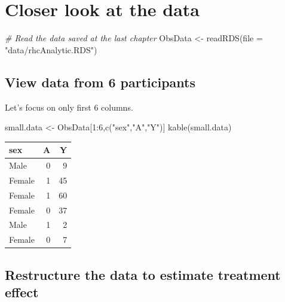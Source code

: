 \documentclass[
]{book}
\newenvironment{Shaded}{\begin{snugshade}}{\end{snugshade}}
\newcommand{\AttributeTok}[1]{\textcolor[rgb]{0.77,0.63,0.00}{#1}}
\newcommand{\CommentTok}[1]{\textcolor[rgb]{0.56,0.35,0.01}{\textit{#1}}}
\newcommand{\DecValTok}[1]{\textcolor[rgb]{0.00,0.00,0.81}{#1}}
\newcommand{\FunctionTok}[1]{\textcolor[rgb]{0.00,0.00,0.00}{#1}}
\newcommand{\NormalTok}[1]{#1}
\newcommand{\OtherTok}[1]{\textcolor[rgb]{0.56,0.35,0.01}{#1}}
\newcommand{\SpecialCharTok}[1]{\textcolor[rgb]{0.00,0.00,0.00}{#1}}
\newcommand{\StringTok}[1]{\textcolor[rgb]{0.31,0.60,0.02}{#1}}
\begin{document}
\hypertarget{closer-look-at-the-data}{%
\section{Closer look at the data}\label{closer-look-at-the-data}}

\begin{Shaded}
\begin{Highlighting}[]
\CommentTok{\# Read the data saved at the last chapter}
\NormalTok{ObsData }\OtherTok{\textless{}{-}} \FunctionTok{readRDS}\NormalTok{(}\AttributeTok{file =} \StringTok{"data/rhcAnalytic.RDS"}\NormalTok{)}
\end{Highlighting}
\end{Shaded}

\hypertarget{view-data-from-6-participants}{%
\subsection{View data from 6 participants}\label{view-data-from-6-participants}}

Let's focus on only first 6 columns.

\begin{Shaded}
\begin{Highlighting}[]
\NormalTok{small.data }\OtherTok{\textless{}{-}}\NormalTok{ ObsData[}\DecValTok{1}\SpecialCharTok{:}\DecValTok{6}\NormalTok{,}\FunctionTok{c}\NormalTok{(}\StringTok{"sex"}\NormalTok{,}\StringTok{"A"}\NormalTok{,}\StringTok{"Y"}\NormalTok{)]}
\FunctionTok{kable}\NormalTok{(small.data)}
\end{Highlighting}
\end{Shaded}

\begin{tabular}{l|r|r}
\hline
sex & A & Y\\
\hline
Male & 0 & 9\\
\hline
Female & 1 & 45\\
\hline
Female & 1 & 60\\
\hline
Female & 0 & 37\\
\hline
Male & 1 & 2\\
\hline
Female & 0 & 7\\
\hline
\end{tabular}

\hypertarget{restructure-the-data-to-estimate-treatment-effect}{%
\subsection{Restructure the data to estimate treatment effect}\label{restructure-the-data-to-estimate-treatment-effect}}
\end{document}
